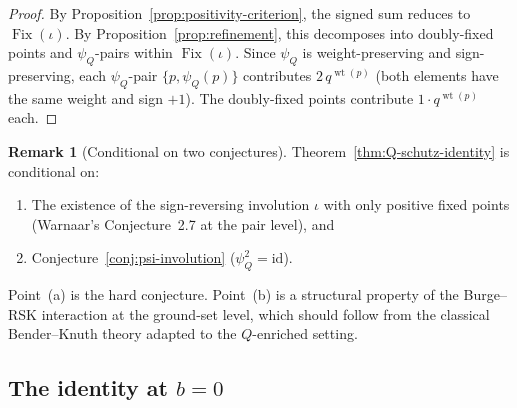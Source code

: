 \documentclass[11pt]{article}
\DeclareMathOperator{\wt}{wt}
\DeclareMathOperator{\Fix}{Fix}
\theoremstyle{plain}
\theoremstyle{definition}
\newtheorem{remark}[theorem]{Remark}
\begin{document}
\begin{proof}
By Proposition~\ref{prop:positivity-criterion}, the signed sum
reduces to $\Fix(\iota)$.  By
Proposition~\ref{prop:refinement}, this decomposes into
doubly-fixed points and $\psi_Q$-pairs within $\Fix(\iota)$.
Since $\psi_Q$ is weight-preserving and sign-preserving, each
$\psi_Q$-pair $\{p, \psi_Q(p)\}$ contributes
$2\, q^{\wt(p)}$ (both elements have the same weight and sign
$+1$).  The doubly-fixed points contribute
$1 \cdot q^{\wt(p)}$ each.
\end{proof}

\begin{remark}[Conditional on two conjectures]
\label{rem:conditional}
Theorem~\ref{thm:Q-schutz-identity} is conditional on:
\begin{enumerate}
  \item[(a)] The existence of the sign-reversing involution
    $\iota$ with only positive fixed points (Warnaar's
    Conjecture~2.7 at the pair level), and
  \item[(b)] Conjecture~\ref{conj:psi-involution}
    ($\psi_Q^2 = \mathrm{id}$).
\end{enumerate}
Point~(a) is the hard conjecture.  Point~(b) is a structural
property of the Burge--RSK interaction at the ground-set level,
which should follow from the classical Bender--Knuth theory
adapted to the $Q$-enriched setting.
\end{remark}


\subsection{The identity at $b = 0$}
\end{document}
